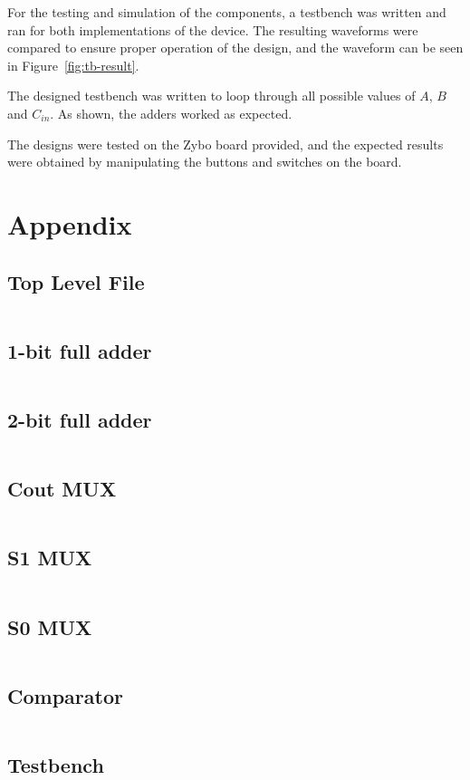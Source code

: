 \documentclass{article}
\begin{document}
For the testing and simulation of the components, a testbench was written and ran for both implementations of the device.
The resulting waveforms were compared to ensure proper operation of the design, and the waveform can be seen in Figure~\ref{fig:tb-result}.

The designed testbench was written to loop through all possible values of $A$, $B$ and $C_{in}$.
As shown, the adders worked as expected.

The designs were tested on the Zybo board provided, and the expected results were obtained by manipulating the buttons and switches on the board.


\pagebreak
\section*{Appendix}

\subsection{Top Level File}
\inputminted{vhdl}{../src/lab1_top.vhd}

\pagebreak
\subsection{1-bit full adder}
\inputminted{vhdl}{../src/full_adder_1bit.vhd}

\pagebreak
\subsection{2-bit full adder}
\inputminted{vhdl}{../src/full_adder_2bit.vhd}

\pagebreak
\subsection{Cout MUX}
\inputminted{vhdl}{../src/Co_mux.vhd}

\pagebreak
\subsection{S1 MUX}
\inputminted{vhdl}{../src/S1_mux.vhd}

\pagebreak
\subsection{S0 MUX}
\inputminted{vhdl}{../src/S0_mux.vhd}

\pagebreak
\subsection{Comparator}
\inputminted{vhdl}{../src/Comparator.vhd}

\pagebreak
\subsection{Testbench}
\inputminted{vhdl}{../test/full_adder_2bit_tb.vhd}

\renewcommand{\thepage}{}
\end{document}
